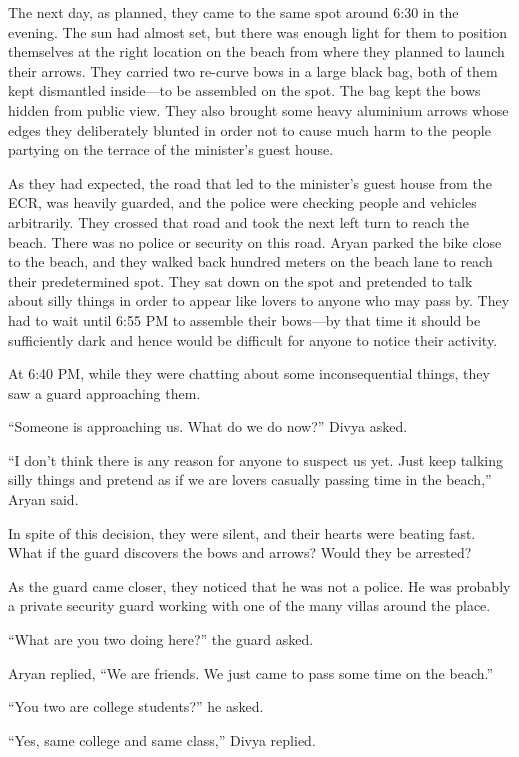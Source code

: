 The next day, as planned, they came to the same spot around 6:30 in the evening.
The sun had almost set, but there was enough light for them to position
themselves at the right location on the beach from where they planned to launch
their arrows. They carried two re-curve bows in a large black bag, both of them
kept dismantled inside—to be assembled on the spot. The bag kept the bows
hidden from public view. They also brought some heavy aluminium arrows whose
edges they deliberately blunted in order not to cause much harm to the people
partying on the terrace of the minister's guest house.

As they had expected, the road that led to the minister's guest house from the
ECR, was heavily guarded, and the police were checking people and vehicles
arbitrarily. They crossed that road and took the next left turn to reach the
beach. There was no police or security on this road. Aryan parked the bike close
to the beach, and they walked back hundred meters on the beach lane to reach
their predetermined spot. They sat down on the spot and pretended to talk about
silly things in order to appear like lovers to anyone who may pass by. They had
to wait until 6:55 PM to assemble their bows—by that time it should be
sufficiently dark and hence would be difficult for anyone to notice their
activity.

At 6:40 PM, while they were chatting about some inconsequential things, they saw
a guard approaching them.

“Someone is approaching us. What do we do now?” Divya asked.

“I don't think there is any reason for anyone to suspect us yet. Just keep
talking silly things and pretend as if we are lovers casually passing time in
the beach,” Aryan said.

In spite of this decision, they were silent, and their hearts were beating fast.
What if the guard discovers the bows and arrows? Would they be arrested?

As the guard came closer, they noticed that he was not a police. He was probably
a private security guard working with one of the many villas around the place.

“What are you two doing here?” the guard asked.

Aryan replied, “We are friends. We just came to pass some time on the beach.”

“You two are college students?” he asked.

“Yes, same college and same class,” Divya replied.

